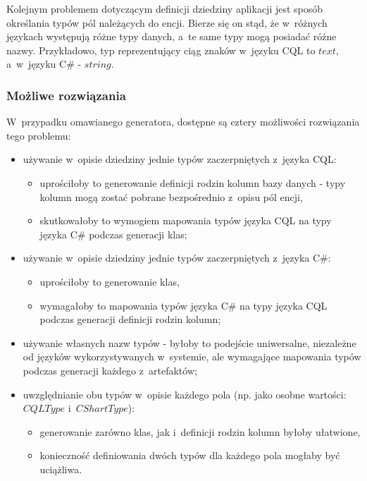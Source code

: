 Kolejnym problemem dotyczącym definicji dziedziny aplikacji jest sposób określania typów pól należących do encji.
Bierze się on stąd, że w~różnych językach występują różne typy danych, a~te same typy mogą posiadać różne nazwy.
Przykładowo, typ reprezentujący ciąg znaków w~języku CQL to $text$, a~w~języku C\# - $string$.

\subsubsection{Możliwe rozwiązania}

W~przypadku omawianego generatora, dostępne są cztery możliwości rozwiązania tego problemu:

\begin{itemize}
 \item używanie w~opisie dziedziny jednie typów zaczerpniętych z~języka CQL:
  \begin{itemize}
   \item uprościłoby to generowanie definicji rodzin kolumn bazy danych - typy kolumn mogą zostać pobrane bezpośrednio z~opisu pól encji,
   \item skutkowałoby to wymogiem mapowania typów języka CQL na typy języka C\# podczas generacji klas;
  \end{itemize}
 \item używanie w~opisie dziedziny jednie typów zaczerpniętych z~języka C\#:
  \begin{itemize}
   \item uprościłoby to generowanie klas,
   \item wymagałoby to mapowania typów języka C\# na typy języka CQL podczas generacji definicji rodzin kolumn;
  \end{itemize}
 \item używanie własnych nazw typów - byłoby to podejście uniwersalne, niezależne od języków wykorzystywanych w~systemie, ale wymagające mapowania typów podczas generacji każdego z~artefaktów;
 \item uwzględnianie obu typów w~opisie każdego pola (np. jako osobne wartości: $CQLType$ i~$CShartType$):
  \begin{itemize}
   \item generowanie zarówno klas, jak i~definicji rodzin kolumn byłoby ułatwione,
   \item konieczność definiowania dwóch typów dla każdego pola mogłaby być uciążliwa.
  \end{itemize}
\end{itemize}

